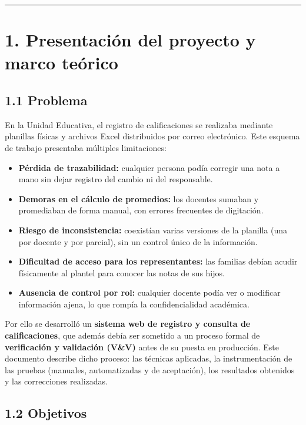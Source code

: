 \documentclass[11pt,a4paper]{article}
\begin{document}
\hrule\vspace{0.4em}


\section*{1. Presentación del proyecto y marco teórico}


\subsection*{1.1 Problema}


En la Unidad Educativa, el registro de calificaciones se realizaba mediante planillas físicas y archivos Excel distribuidos por correo electrónico. Este esquema de trabajo presentaba múltiples limitaciones:


\begin{itemize}[leftmargin=*]
\item \textbf{Pérdida de trazabilidad:} cualquier persona podía corregir una nota a mano sin dejar registro del cambio ni del responsable.
\item \textbf{Demoras en el cálculo de promedios:} los docentes sumaban y promediaban de forma manual, con errores frecuentes de digitación.
\item \textbf{Riesgo de inconsistencia:} coexistían varias versiones de la planilla (una por docente y por parcial), sin un control único de la información.
\item \textbf{Dificultad de acceso para los representantes:} las familias debían acudir físicamente al plantel para conocer las notas de sus hijos.
\item \textbf{Ausencia de control por rol:} cualquier docente podía ver o modificar información ajena, lo que rompía la confidencialidad académica.
\end{itemize}


Por ello se desarrolló un \textbf{sistema web de registro y consulta de calificaciones}, que además debía ser sometido a un proceso formal de \textbf{verificación y validación (V\&V)} antes de su puesta en producción. Este documento describe dicho proceso: las técnicas aplicadas, la instrumentación de las pruebas (manuales, automatizadas y de aceptación), los resultados obtenidos y las correcciones realizadas.


\subsection*{1.2 Objetivos}
\end{document}
